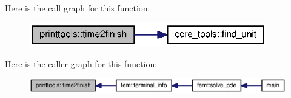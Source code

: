 Here is the call graph for this function\+:\nopagebreak
\begin{figure}[H]
\begin{center}
\leavevmode
\includegraphics[width=294pt]{namespaceprinttools_abccc581ca4de60e3b372b36441c016f9_cgraph}
\end{center}
\end{figure}




Here is the caller graph for this function\+:\nopagebreak
\begin{figure}[H]
\begin{center}
\leavevmode
\includegraphics[width=350pt]{namespaceprinttools_abccc581ca4de60e3b372b36441c016f9_icgraph}
\end{center}
\end{figure}



